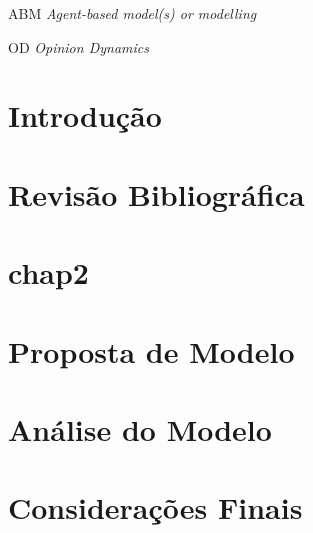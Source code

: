 \documentclass[
12pt,				%
openright,			%
oneside,			%
a4paper,			%
english, %
french, %
spanish, %
brazil %
]{abntex2}
\begin{document}
	
\begin{siglas}
\item[ABM] \textit{Agent-based model(s) or modelling}
  \item[OD] \textit{ Opinion Dynamics}
 
\end{siglas}
	\tableofcontents*
	\cleardoublepage
	\textual
	
	
	
\chapter*[Introdução]{Introdução}
      
\chapter{Revisão Bibliográfica}





\chapter{chap2}


 


 \chapter{Proposta de Modelo}

 




\chapter{Análise do Modelo}



\chapter*[Considerações Finais]{Considerações Finais}
  
    

	
\postextual
	

	
 \printindex
	
\end{document}
